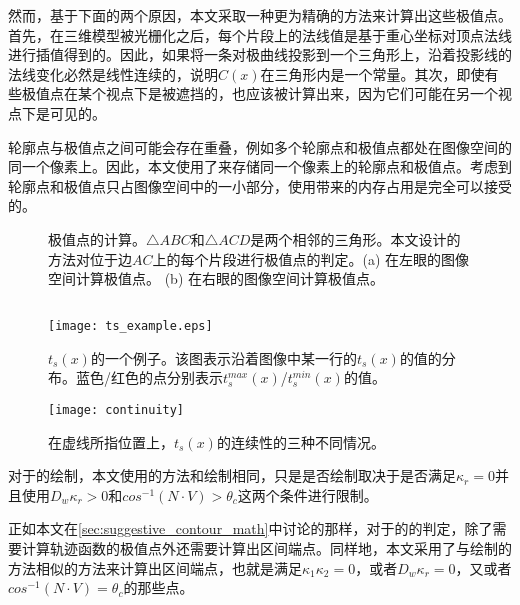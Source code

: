 {然而，基于下面的两个原因，本文采取一种更为精确的方法来计算出这些极值点。首先，在三维模型被光栅化之后，每个片段上的法线值是基于重心坐标对顶点法线进行插值得到的。因此，如果将一条对极曲线投影到一个三角形上，沿着投影线的法线变化必然是线性连续的，说明$C(x)$在三角形内是一个常量。其次，即使有些极值点在某个视点下是被遮挡的，也应该被计算出来，因为它们可能在另一个视点下是可见的。

轮廓点与极值点之间可能会存在重叠，例如多个轮廓点和极值点都处在图像空间的同一个像素上。因此，本文使用了\ppll{}来存储同一个像素上的轮廓点和极值点。考虑到轮廓点和极值点只占图像空间中的一小部分，使用\ppll{}带来的内存占用是完全可以接受的。

\begin{figure}[!t]
    \centering
    \hfil
    \caption{极值点的计算。$\triangle ABC$和$\triangle ACD$是两个相邻的三角形。本文设计的方法对位于边$AC$上的每个片段进行极值点的判定。(a) 在左眼的图像空间计算极值点。 (b) 在右眼的图像空间计算极值点。} \label{fig:extreme points}
\end{figure}

\subsection{\scon{}}

\begin{figure}[!t]
    \centering
    \texttt{[image: ts\_example.eps]}
    \caption{\label{fig:continuity_example}
    $t_s(x)$的一个例子。该图表示沿着图像中某一行的$t_s(x)$的值的分布。蓝色/红色的点分别表示$t_s^{max}(x)$/$t_s^{min}(x)$的值。}
\end{figure}

\begin{figure}[!t]
    \centering
    \texttt{[image: continuity]}
    \caption{在虚线所指位置上，$t_s(x)$的连续性的三种不同情况。}
    \label{fig:ts_continuity}
\end{figure}

\label{sec:suggestive_contour_algorithm}
对于\scon{}的绘制，本文使用的方法和绘制\con{}相同，只是是否绘制取决于是否满足$\kappa_r = 0$并且使用$D_w\kappa_r > 0$和$cos^{-1}(N\cdot{V}) > \theta_c$这两个条件进行限制。

正如本文在\ref{sec:suggestive_contour_math}中讨论的那样，对于\scon{}的\epsl{}的判定，除了需要计算轨迹函数的极值点外还需要计算出区间端点。同样地，本文采用了与绘制\con{}的方法相似的方法来计算出区间端点，也就是满足$\kappa_1\kappa_2 = 0$，或者$D_w\kappa_r = 0$，又或者$cos^{-1}(N\cdot{V}) = \theta_c$的那些点。

}
